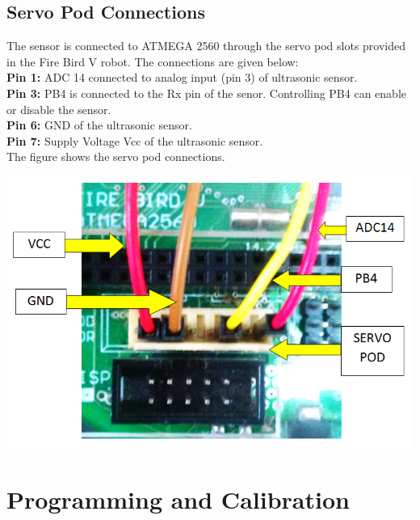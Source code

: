 \documentclass[a4paper,29.6pt]{article}
\begin{document}

\subsection{Servo Pod Connections}
\begin{small}
The sensor is connected to ATMEGA 2560 through the servo pod slots provided in the Fire Bird V robot. The connections are given below:\\
\textbf{Pin 1:} ADC 14 connected to analog input (pin 3) of ultrasonic sensor.\\
\textbf{Pin 3:} PB4 is connected to the Rx pin of the senor. Controlling PB4 can enable or disable the sensor.\\
\textbf{Pin 6:} GND of the ultrasonic sensor.\\
\textbf{Pin 7:} Supply Voltage Vcc of the ultrasonic sensor.\\
The figure shows the servo pod connections.
\begin{center}
\includegraphics[scale=0.5]{4}
\end{center}

 

\end{small}

\section{Programming and Calibration}
\end{document}
